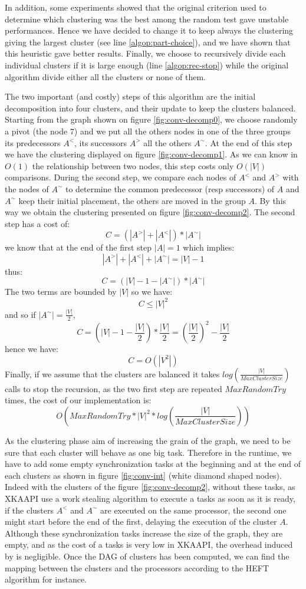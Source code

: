 \documentclass[10pt, conference, compsocconf,pdftex,dvipsnames]{IEEEtran}
\begin{document}
In addition, some experiments showed that the original criterion used to
determine which clustering was the best among the random test gave unstable
performances. Hence we have decided to change it to keep always the clustering
giving the largest cluster (see line \ref{algop:part-choice}), and we have
shown that this heuristic gave better results. Finally, we choose to
recursively divide each individual clusters if it is large enough (line
\ref{algop:rec-stop}) while the original algorithm divide either all the
clusters or none of them.

The two important (and costly) steps of this algorithm are the initial
decomposition into four clusters, and their update to keep the clusters
balanced.  Starting from the graph shown on figure \ref{fig:conv-decomp0}, we
choose randomly a pivot (the node $7$) and we put all the others nodes in one
of the three groups its predecessors $A^<$, its successors $A^>$ all the
others $A^{\sim}$. At the end of this step we have the clustering displayed on
figure \ref{fig:conv-decomp1}. As we can know in $O(1)$ the relationship
between two nodes, this step costs only $O(|V|)$ comparisons. During the second
step, we compare each nodes of $A^<$ and $A^>$ with the nodes of $A^{\sim}$ to
determine the common predecessor (resp successors) of $A$ and $A^{\sim}$ keep
their initial placement, the others are moved in the group $A$.  By this way
we obtain the clustering presented on figure \ref{fig:conv-decomp2}. The
second step has a cost of:
$$C=(|A^>|+|A^<|)*|A^{\sim}|$$ 
we know that at the end of the first step $|A|=1$ which implies: 
$$|A^>|+|A^<|+|A^{\sim}|=|V|-1$$
thus:
$$C=(|V|-1-|A^{\sim}|)*|A^{\sim}|$$ 
The two terms are bounded by $|V|$ so we have: 
$$C\leq|V|^2$$
and so if $|A^{\sim}|=\frac{|V|}{2}$,
$$C=(|V|-1-\frac{|V|}{2})*\frac{|V|}{2}=\left(\frac{|V|}{2}\right)^2-\frac{|V|}{2}$$
hence we have: 
$$C=O(|V^2|)$$ 
Finally, if we assume that the clusters are balanced it takes
$log\left(\frac{|V|}{MaxClusterSize}\right)$ calls to stop the recursion, as
the two first step are repeated $MaxRandomTry$ times, the
cost of our implementation is:
$$O\left(MaxRandomTry*|V|^2*log\left(\frac{|V|}{MaxClusterSize}\right)\right)$$

As the clustering phase aim of increasing the grain of the graph, we need to
be sure that each cluster will behave as one big task. Therefore in the
runtime, we have to add some empty synchronization tasks at the beginning and
at the end of each clusters as shown in figure \ref{fig:conv-int} (white
diamond shaped nodes). Indeed with the clusters of the figure
\ref{fig:conv-decomp2}, without these tasks,  as XKAAPI use a work stealing
algorithm to execute a tasks as soon as it is ready, if the clusters $A^<$ and
$A^{\sim}$ are executed on the same processor, the second one might start
before the end of the first, delaying the execution of the cluster $A$.
Although these synchronization tasks increase the size of the graph, they are
empty, and as the cost of a tasks is very low in XKAAPI, the overhead induced
by is negligible. Once the DAG of clusters has been computed, we can find the
mapping between the clusters and the processors according to the HEFT
algorithm for instance. 
\end{document}
